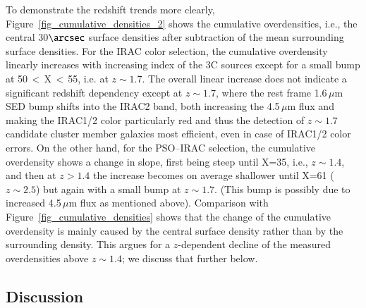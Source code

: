 \documentclass[mathleft,fleqn,%
]{an}
\begin{document}
To demonstrate the redshift trends more clearly, 
Figure~\ref{fig_cumulative_densities_2} shows the cumulative
overdensities, i.e.,  the central 30$\arcsec$ surface densities  
after subtraction of the mean surrounding surface densities. 
For the IRAC color selection, the cumulative overdensity linearly increases with
increasing index of the 3C sources except for a small bump at
50\,$<$\,X\,$<$\,55, 
i.e. at  $z \sim 1.7$. 
The  overall  linear increase does not indicate a
significant redshift dependency except at $z \sim 1.7$, where the rest frame 1.6\,$\mu$m SED bump
shifts into the IRAC2 band, both increasing the 4.5\,$\mu$m flux and making 
the IRAC1/2 color particularly red
and thus the detection of $z \sim
1.7$ candidate cluster member galaxies most efficient, even in case of
IRAC1/2 color errors.  
On the other hand, for the PSO--IRAC  selection, the 
cumulative overdensity 
shows a change in slope, first being steep until X=35, i.e., $z \sim 1.4$,
and then at $z>1.4$ the increase becomes on average shallower until
X=61 ($z\sim2.5$) but again with a small bump at $z \sim 1.7$. 
(This bump is possibly due to increased 4.5\,$\mu$m flux as mentioned above).  
Comparison with %
Figure~\ref{fig_cumulative_densities} shows that the change of the
cumulative overdensity is mainly caused by the central surface density
rather than by the surrounding density.
This argues for a  
$z$-dependent decline of the measured overdensities
above  $z\sim 1.4$; we discuss that further below.

\subsection{Discussion}
\label{sec:discussion}
\end{document}
